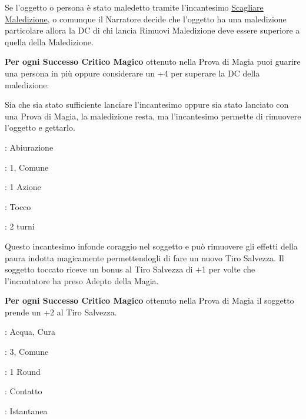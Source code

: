 \begin{multicols}{2}
Se l'oggetto o persona è stato maledetto tramite l'incantesimo \hyperlink{Scagliare Maledizione}{Scagliare Maledizione}, o comunque il Narratore decide che l'oggetto ha una maledizione particolare allora la DC di chi lancia Rimuovi Maledizione deve essere superiore a quella della Maledizione.

\textbf{Per ogni Successo Critico Magico} ottenuto nella Prova di Magia puoi guarire una persona in più oppure considerare un +4 per superare la DC della maledizione.

Sia che sia stato sufficiente lanciare l'incantesimo oppure sia stato lanciato con una Prova di Magia, la maledizione resta, ma l'incantesimo permette di rimuovere l'oggetto e gettarlo.


\noindent\colorbox{OBSSgold!10}{
\begin{minipage}{0.95\linewidth}
\begin{description}[noitemsep, topsep=0pt, parsep=0pt, partopsep=0pt, leftmargin=0cm, labelwidth=1.3cm]
	\item[\textbf{Lista}]: Abiurazione
	\item[\textbf{Livello}]: 1, Comune
	\item[\textbf{Lancio}]: 1 Azione
	\item[\textbf{Gittata}]: Tocco
	\item[\textbf{Durata}]: 2 turni
\end{description}
\end{minipage}}\smallskip

Questo incantesimo infonde coraggio nel soggetto e può rimuovere gli effetti della paura indotta magicamente permettendogli di fare un nuovo Tiro Salvezza. Il soggetto toccato riceve un bonus al Tiro Salvezza di +1 per volte che l'incantatore ha preso Adepto della Magia.

\textbf{Per ogni Successo Critico Magico} ottenuto nella Prova di Magia il soggetto prende un +2 al Tiro Salvezza.


\label{incrimuoviveleno}\hypertarget{incrimuoviveleno}{}
\noindent
\begin{description}[noitemsep, topsep=0pt, parsep=0pt, partopsep=0pt, leftmargin=0cm, labelwidth=1.3cm]
	\item[\textbf{Lista}]: Acqua, Cura
	\item[\textbf{Livello}]: 3, Comune
	\item[\textbf{Lancio}]: 1 Round
	\item[\textbf{Gittata}]: Contatto
	\item[\textbf{Durata}]: Istantanea
\end{description}


\end{multicols}
